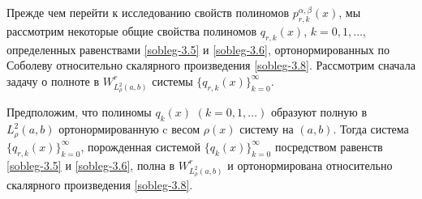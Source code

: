 Прежде чем  перейти к исследованию свойств полиномов $p_{r,k}^{\alpha,\beta}(x)$, мы рассмотрим некоторые общие свойства  полиномов $q_{r,k}(x)$, $k=0,1,\ldots$, определенных равенствами \eqref{sobleg-3.5} и \eqref{sobleg-3.6},  ортонормированных по Соболеву относительно скалярного произведения \eqref{sobleg-3.8}. Рассмотрим сначала задачу о полноте в $W^r_{L^2_\rho(a,b)}$ системы $\{q_{r,k}(x)\}_{k=0}^\infty$.

\begin{state}\label{soblegstate1}
Предположим, что полиномы $q_k(x)$ $(k=0,1,\ldots)$ образуют полную в $L^2_\rho(a,b)$ ортонормированную   c весом   $\rho(x)$ систему на  $(a,b)$. Тогда система $\{q_{r,k}(x)\}_{k=0}^\infty$, порожденная системой $\{q_{k}(x)\}_{k=0}^\infty$ посредством равенств \eqref{sobleg-3.5} и \eqref{sobleg-3.6}, полна  в $W^r_{L^2_\rho(a,b)}$ и ортонормирована относительно скалярного произведения \eqref{sobleg-3.8}.
\end{state}



